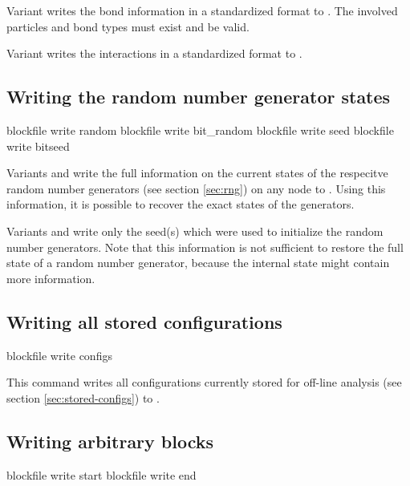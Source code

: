Variant  writes the bond information in a standardized
format to . The involved particles and bond types must
exist and be valid.

Variant  writes the interactions in a standardized format
to .

\subsection{Writing the random number generator states}
\begin{essyntax}
   blockfile  write random
   blockfile  write bit_random
   blockfile  write seed
   blockfile  write bitseed
\end{essyntax}

Variants  and  write the full information on the
current states of the respecitve random number generators (see section
\vref{sec:rng}) on any node to .  Using this information,
it is possible to recover the exact states of the generators.

Variants  and  write only the seed(s) which were
used to initialize the random number generators. Note that this
information is not sufficient to restore the full state of a random
number generator, because the internal state might contain more
information.

\subsection{Writing all stored configurations}
\label{sec:blockfile:configs}
\begin{essyntax}
  blockfile  write configs
\end{essyntax}

This command writes all configurations currently stored for off-line
analysis (see section \vref{sec:stored-configs}) to .

\subsection{Writing arbitrary blocks}

\begin{essyntax}
   blockfile  write start 
   blockfile  write end
\end{essyntax}

